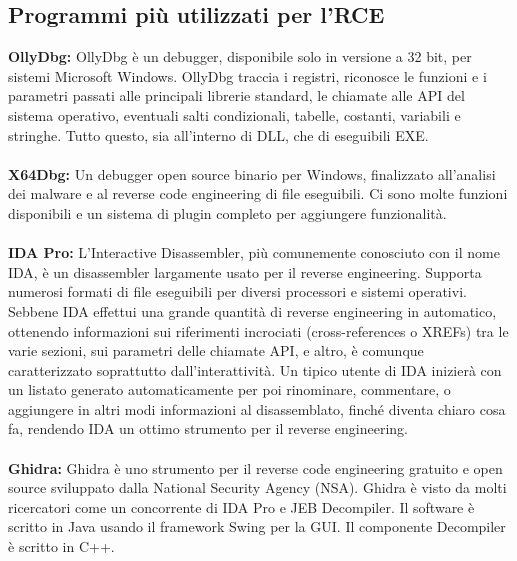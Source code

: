\documentclass[8pt]{extarticle}
\begin{document}
\subsection{Programmi più utilizzati per l’RCE}
\noindent
\textbf{OllyDbg:} OllyDbg è un debugger, disponibile solo in versione a 32 bit, per sistemi Microsoft Windows. 
OllyDbg traccia i registri, riconosce le funzioni e i parametri passati alle principali librerie standard, 
le chiamate alle API del sistema operativo, eventuali salti condizionali, tabelle, costanti, variabili e 
stringhe. Tutto questo, sia all'interno di DLL, che di eseguibili EXE.\\\\
\textbf{X64Dbg:} Un debugger open source binario per Windows, finalizzato all'analisi dei malware e al 
reverse code engineering di file eseguibili. Ci sono molte funzioni disponibili e un sistema di plugin 
completo per aggiungere funzionalità.\\\\
\textbf{IDA Pro:} L'Interactive Disassembler, più comunemente conosciuto con il nome IDA, è un 
disassembler largamente usato per il reverse engineering. Supporta numerosi formati di file eseguibili 
per diversi processori e sistemi operativi.
Sebbene IDA effettui una grande quantità di reverse engineering in automatico, ottenendo informazioni 
sui riferimenti incrociati (cross-references o XREFs) tra le varie sezioni, sui parametri delle chiamate 
API, e altro, è comunque caratterizzato soprattutto dall'interattività. Un tipico utente di IDA inizierà 
con un listato generato automaticamente per poi rinominare, commentare, o aggiungere in altri modi 
informazioni al disassemblato, finché diventa chiaro cosa fa, rendendo IDA un ottimo strumento per il 
reverse engineering.\\\\
\textbf{Ghidra:} Ghidra è uno strumento per il reverse code engineering gratuito e open source sviluppato 
dalla National Security Agency (NSA). Ghidra è visto da molti ricercatori come un concorrente di IDA Pro 
e JEB Decompiler. Il software è scritto in Java usando il framework Swing per la GUI. Il componente 
Decompiler è scritto in C++. 
\end{document}
